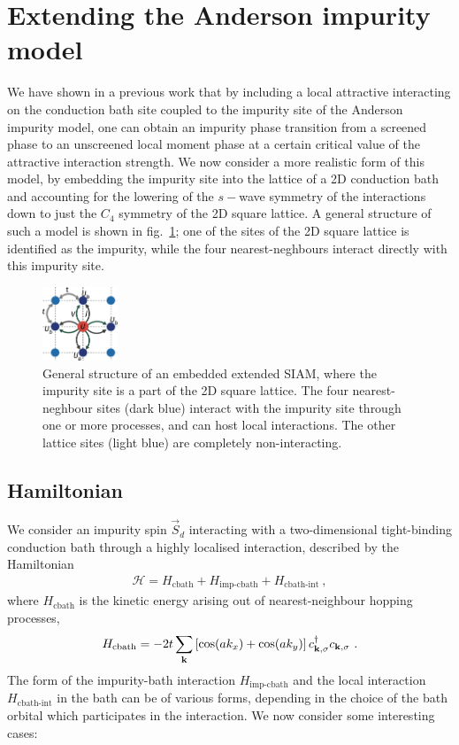 \documentclass[reprint,hidelinks,onecolumn]{revtex4-2}
\begin{document}
\section{Extending the Anderson impurity model}
We have shown in a previous work that by including a local attractive interacting on the conduction bath site coupled to the impurity site of the Anderson impurity model, one can obtain an impurity phase transition from a screened phase to an unscreened local moment phase at a certain critical value of the attractive interaction strength. We now consider a more realistic form of this model, by embedding the impurity site into the lattice of a 2D  conduction bath and accounting for the lowering of the \(s-\)wave symmetry of the interactions down to just the \(C_4\) symmetry of the 2D square lattice. A general structure of such a model is shown in fig.~\ref{embeddedEsiam}; one of the sites of the 2D square lattice is identified as the impurity, while the four nearest-neghbours interact directly with this impurity site. 
\begin{figure}[htpb]
	\centering
	\includegraphics[width=0.2\textwidth]{pWaveEsiam.pdf}
	\caption{General structure of an embedded extended SIAM, where the impurity site is a part of the 2D square lattice. The four nearest-neghbour sites (dark blue) interact with the impurity site through one or more processes, and can host local interactions. The other lattice sites (light blue) are completely non-interacting.}
	\label{embeddedEsiam}
\end{figure}
\subsection{Hamiltonian}
We consider an impurity spin \(\vec S_d\) interacting with a two-dimensional tight-binding conduction bath through a highly localised interaction, described by the Hamiltonian
\begin{equation}\begin{aligned}
	\mathcal{H} = H_\text{cbath} + H_\text{imp-cbath} + H_\text{cbath-int}~,
\end{aligned}\end{equation}
where \(H_\text{cbath}\) is the kinetic energy arising out of nearest-neighbour hopping processes,
\begin{equation}\begin{aligned}
	H_\text{cbath} = -2t\sum_{{\bf k}}\left[\cos(ak_x) + \cos(ak_y)\right] c^\dagger_{{\bf k},\sigma}c_{{\bf k},\sigma}~.
\end{aligned}\end{equation}
The form of the impurity-bath interaction \(H_\text{imp-cbath}\) and the local interaction \(H_\text{cbath-int}\) in the bath can be of various forms, depending in the choice of the bath orbital which participates in the interaction. We now consider some interesting cases:
\end{document}
